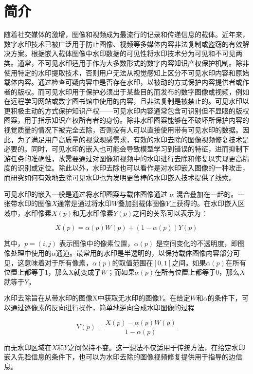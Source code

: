 \section{简介}
\label{sec:introduction}

随着社交媒体的激增，图像和视频成为最流行的记录和传递信息的载体。近年来，数字水印技术已被广泛用于防止图像、视频等多媒体内容非法复制或盗窃的有效解决方案。根据嵌入载体图像中水印数据的可见性将水印技术分为可见和不可见两类。通常，不可见水印适用于作为大多数形式的数字内容知识产权保护机制。除非使用特定的水印提取技术，否则用户无法从视觉感知上区分不可见水印内容和原始载体内容。通过检查可疑内容中是否存在水印，以被动的方式保护内容提供者或作者的版权。而可见水印用于保护必须出于某些目的而发布的数字图像或视频，例如在远程学习网站或数字图书馆中使用的内容，且非法复制是被禁止的。可见水印以更积极主动的方式保护知识产权——可见水印内容通常包含可识别但不显眼的版权图案，用于指示知识产权所有者的身份。除非水印图案能够在不破坏所保护内容的视觉质量的情况下被完全去除，否则没有人可以直接使用带有可见水印的数据。因此，为了满足用户高质量的视觉观感需求，有效的水印去除的图像视频修复技术是必要的。同时，可见水印的嵌入也可能会导致模型学习到错误的特征，进而抑制下游任务的准确性，故需要通过对图像和视频中的水印进行去除和修复以实现更高精度的识别或定位。除此以外，水印去除也可以看作是对水印嵌入图像的一种攻击，而研究如何有效地去除可见水印也为发明更鲁棒的水印嵌入技术提供了线索。

可见水印的嵌入一般是通过将水印图案与载体图像通过 $\alpha$ 混合叠加在一起的。一张带水印的图像$X$通常是通过将水印$W$叠加到载体图像$Y$上获得的。在水印嵌入区域中，水印像素$X(p)$和无水印像素$Y(p)$之间的关系可以表示为：

\begin{equation}
X(p)=\alpha(p) W(p)+(1-\alpha(p)) Y(p)
\end{equation}

其中，$p=(i,j)$ 表示图像中的像素位置，$\alpha(p)$ 是空间变化的不透明度，即图像处理中使用的$\alpha$通道。最常用的水印是半透明的，以保持载体图像内容部分可见，这意味着对于所有像素，$\alpha(p)$的取值范围在$[0, 1]$之间。如果$\alpha(p)$在所有位置上都等于1，那么X就变成了$W$；而如果$\alpha(p)$在所有位置上都等于0，那么$X$就等于$Y$。

水印去除旨在从带水印的图像X中获取无水印的图像$Y$。在给定$W$和$\alpha$的条件下，可以通过逐像素的反向进行操作，简单地逆向合成水印图像的过程

\begin{equation}
Y(p)=\frac{X(p)-\alpha(p) W(p)}{1-\alpha(p)}
\end{equation}

而无水印区域在$X$和$Y$之间保持不变。这一想法不仅适用于传统方法，在给定水印嵌入先验信息的条件下，也可以为水印去除的图像视频修复提供用于指导的边信息。
